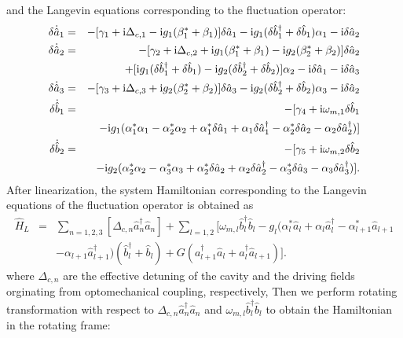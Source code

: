 \documentclass{article}
\begin{document}
and the Langevin equations corresponding to the fluctuation operator:
\begin{eqnarray}\label{eq7}
\delta\dot{\hat a}_1 &=& -[\gamma_1+{\rm i}\Delta_{c,1}-{\rm i}g_1(\beta_1^\ast+\beta_1)]\delta\hat a_1-{\rm i}g_1(\delta \hat b_1^{\dag}+\delta\hat b_1)\alpha_1-{\rm i}\delta\hat a_2\nonumber\\
\delta\dot{\hat a}_2 &=& -[\gamma_2+{\rm i}\Delta_{c,2}+{\rm i}g_1(\beta_1^\ast+\beta_1)-{\rm i}g_2(\beta_2^\ast+\beta_2)]\delta\hat a_2\nonumber\\
&&+[{\rm i}g_1(\delta \hat b_1^{\dag}+\delta\hat b_1)-{\rm i}g_2(\delta\hat b_2^{\dag}+\delta\hat b_2)]\alpha_2-{\rm i}\delta\hat a_1-{\rm i}\delta\hat a_3\nonumber\\
\delta\dot{\hat a}_3 &=& -[\gamma_3+{\rm i}\Delta_{c,3}+{\rm i}g_2(\beta_2^\ast+\beta_2)]\delta\hat a_3-{\rm i}g_2(\delta \hat b_2^{\dag}+\delta\hat b_2)\alpha_3-{\rm i}\delta\hat a_2\nonumber\\
\delta\dot{\hat b}_1 &=& -[\gamma_4+{\rm i}\omega_{m,1}\delta\hat b_1\nonumber\\
&&-{\rm i}g_1(\alpha_1^\ast\alpha_1-\alpha_2^\ast\alpha_2+\alpha_1^\ast\delta\hat a_1+\alpha_1\delta\hat a_1^{\dag}-\alpha_2^\ast\delta\hat a_2-\alpha_2\delta\hat a_2^{\dag})]\nonumber\\
\delta\dot{\hat b}_2 &=& -[\gamma_5+{\rm i}\omega_{m,2}\delta\hat b_2\nonumber\\
&&-{\rm i}g_2(\alpha_2^\ast\alpha_2-\alpha_3^\ast\alpha_3+\alpha_2^\ast\delta\hat a_2+\alpha_2\delta\hat a_2^{\dag}-\alpha_3^\ast\delta\hat a_3-\alpha_3\delta\hat a_3^{\dag})].
\end{eqnarray}
After linearization, the system Hamiltonian corresponding to the Langevin equations of the fluctuation operator is obtained as
\begin{eqnarray}\label{eq8}
\hat{H}_L &=& \sum_{n=1,2,3}[\Delta_{c,n}\hat a_n^{\dag}\hat a_n]+\sum_{l=1,2}[\omega_{m,l}\hat b_l^{\dag}\hat b_l-g_l(\alpha_l^{\ast}\hat a_l+\alpha_l \hat a_l^{\dag}-\alpha_{l+1}^{\ast}\hat a_{l+1}\nonumber \\ 
&&-\alpha_{l+1}\hat a_{l+1}^{\dag})(\hat b_l^{\dag}+\hat b_l)+G(a_{l+1}^{\dag}\hat a_l+a_l^{\dag}\hat a_{l+1})].
\end{eqnarray}
where $\Delta_{c,n}$ are the effective detuning of the cavity and the driving fields orginating from optomechanical coupling, respectively, Then we perform rotating transformation with respect to $\Delta_{c,n}\hat a_n^{\dag}\hat a_n$ and $\omega_{m,l}\hat b_l^{\dag}\hat b_l$ to obtain the Hamiltonian in the rotating frame:
\end{document}
